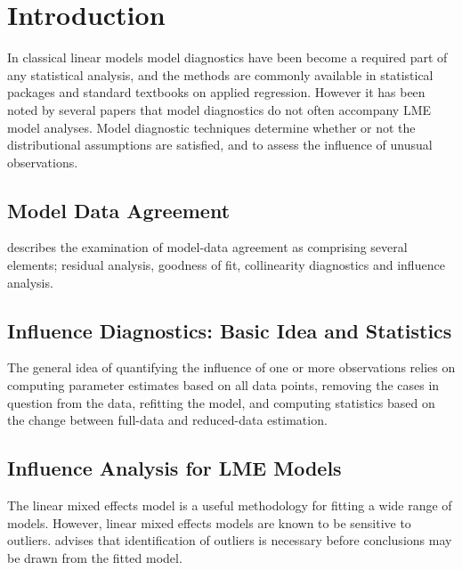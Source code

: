 \documentclass[Main.tex]{subfiles}
\begin{document}

\section{Introduction}%
In classical linear models model diagnostics have been become a required part of any statistical analysis, and the methods are commonly available in statistical packages and standard textbooks on applied regression. However it has been noted by several papers that model diagnostics do not often accompany LME model analyses.
Model diagnostic techniques determine whether or not the distributional assumptions are satisfied, and to assess the influence of unusual observations.


\subsection{Model Data Agreement} %
\citet{schabenberger} describes the examination of model-data agreement as comprising several elements; residual analysis, goodness of fit, collinearity diagnostics and influence analysis.


\subsection{Influence Diagnostics: Basic Idea and Statistics} %


The general idea of quantifying the influence of one or more observations relies on computing parameter estimates based on all data points, removing the cases in question from the data, refitting the model, and computing statistics based on the change between full-data and reduced-data estimation.






\subsection{Influence Analysis for LME Models} %
The linear mixed effects model is a useful methodology for fitting a wide range of models. However, linear mixed effects models are known to be sensitive to outliers. \citet{Christensen} advises that identification of outliers is necessary before conclusions may be drawn from the fitted model.
\end{document}
